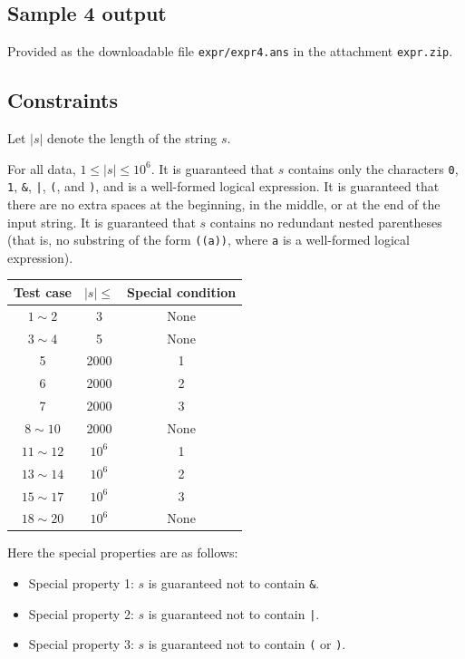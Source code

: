 \documentclass[11pt]{article}
\begin{document}
\subsection*{Sample 4 output}
Provided as the downloadable file \texttt{expr/expr4.ans}
in the attachment \texttt{expr.zip}.

\subsection*{Constraints}
Let $|s|$ denote the length of the string
$s$.

For all data, $1\leq |s|\leq 10^6$.
It is guaranteed that $s$ contains only the characters
\texttt{0}, \texttt{1}, \verb|&|, \verb!|!, \texttt{(}, and \texttt{)},
and is a well-formed logical expression.
It is guaranteed that there are no extra spaces at the beginning,
in the middle, or at the end of the input string.
It is guaranteed that $s$ contains no redundant nested parentheses
(that is, no substring of the form \texttt{((a))}, where \texttt{a}
is a well-formed logical expression).

\begin{center}
\begin{tabular}{ccc}
\toprule
Test case & $|s|\leq$ & Special condition \\
\midrule
$1\sim 2$ & 3 & None \\
$3\sim 4$ & 5 & None \\
5 & 2000 & 1 \\
6 & 2000 & 2 \\
7 & 2000 & 3 \\
$8\sim 10$ & 2000 & None \\
$11\sim 12$ & $10^6$ & 1 \\
$13\sim 14$ & $10^6$ & 2 \\
$15\sim 17$ & $10^6$ & 3 \\
$18\sim 20$ & $10^6$ & None \\
\bottomrule
\end{tabular}
\end{center}

Here the special properties are as follows:
\begin{itemize}
\item Special property 1: $s$ is guaranteed not to contain \verb|&|.
\item Special property 2: $s$ is guaranteed not to contain \verb!|!.
\item Special property 3: $s$ is guaranteed not to contain
\texttt{(} or \texttt{)}.
\end{itemize}
\end{document}
